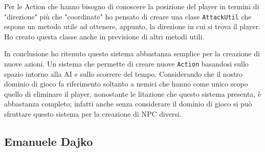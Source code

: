 \documentclass[a4paper,12pt]{report}
\begin{document}
Per le Action che hanno bisogno di conoscere la posizione del player in termini di "direzione" più
che "coordinate" ho pensato di creare una clase \texttt{AttackUtil} che espone un metodo utile
ad ottenere, appunto, la direzione in cui si trova il player.
Ho creato questa classe anche in previsione di altri metodi utili.

In conclusione ho ritenuto questo sistema abbastanza semplice per la creazione di nuove azioni.
Un sistema che permette di creare nuove \texttt{Action} basandosi sullo spazio intorno alla AI
e sullo scorrere del tempo. Considerando che il nostro dominio di gioco fa riferimento soltanto a nemici che hanno
come unico scopo quello di eliminare il player, nonostante le litazione che questo sistema presenta,
è abbastanza completo; infatti anche senza considerare il dominio di gioco si può sfruttare questo sistema
per la creazione di NPC diversi.

\subsection{Emanuele Dajko}
\end{document}
